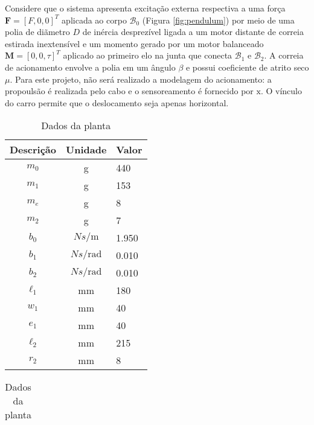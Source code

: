 \documentclass[a4paper, twoside, fleqn]{article}
\begin{document}
    Considere que o sistema apresenta excitação externa respectiva a uma força $\mathbf{F} = [F, 0, 0]^T$ aplicada ao corpo $\mathcal{B}_0$ (Figura \ref{fig:pendulum}) por meio de uma polia de diãmetro $D$ de inércia desprezível ligada a um motor distante de correia estirada inextensível e um momento gerado por um motor balanceado $\mathbf{M} = [0, 0, \tau]^T$ aplicado ao primeiro elo na junta que conecta $\mathcal{B}_1$ e $\mathcal{B}_2$. A correia de acionamento envolve a polia em um ângulo $\beta$ e possui coeficiente de atrito seco $\mu$. Para este projeto, não será realizado a modelagem do acionamento: a propoulsão é realizada pelo cabo e o sensoreamento é fornecido por $\mathrm{x}$. O vínculo do carro permite que o deslocamento seja apenas horizontal.
    
    \begin{table}[!ht]
        \begin{minipage}[b]{0.45\linewidth}\centering
                \begin{tabular}{|c|c|l|}
                    \hline Descrição & Unidade & Valor\\ \hline
                    $m_0$ & g & 440\\
                    $m_1$ & g & 153\\
                    $m_e$ & g & 8\\
                    $m_2$ & g & 7\\
                    $b_0$   & ${N s}/{\mathrm{m}}$ & 1.950\\
                    $b_1$   & ${N s}/{\mathrm{rad}}$ & 0.010\\
                    $b_2$   & ${N s}/{\mathrm{rad}}$ & 0.010\\
                    $\ell_1$ & mm & 180\\ 
                    $w_1$ & mm & 40\\
                    $e_1$ & mm & 40\\
                    $\ell_2$ & mm  & 215\\
                    $r_2$ & mm & 8\\ 
                    \hline
                \end{tabular}
                \caption{Dados da planta}
                \label{tab:dados_planta}
        \end{minipage}
        \hspace{0.5cm}
        \begin{minipage}[b]{0.45\linewidth}
        \centering
                \begin{tabular}{|c|c|c|}

\end{tabular}
\end{minipage}
\end{table}
\end{document}
